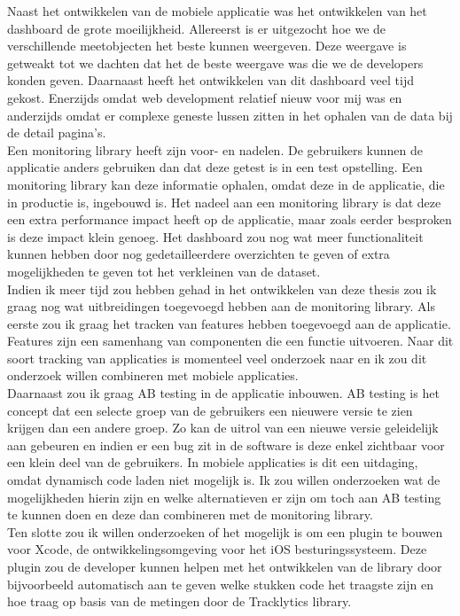 Naast het ontwikkelen van de mobiele applicatie was het ontwikkelen van het dashboard de grote moeilijkheid. Allereerst is er uitgezocht hoe we de verschillende meetobjecten het beste kunnen weergeven. Deze weergave is getweakt tot we dachten dat het de beste weergave was die we de developers konden geven. Daarnaast heeft het ontwikkelen van dit dashboard veel tijd gekost. Enerzijds omdat web development relatief nieuw voor mij was en anderzijds omdat er complexe geneste lussen zitten in het ophalen van de data bij de detail pagina's. \\

Een monitoring library heeft zijn voor- en nadelen. De gebruikers kunnen de applicatie anders gebruiken dan dat deze getest is in een test opstelling. Een monitoring library kan deze informatie ophalen, omdat deze in de applicatie, die in productie is, ingebouwd is. Het nadeel aan een monitoring library is dat deze een extra performance impact heeft op de applicatie, maar zoals eerder besproken is deze impact klein genoeg. Het dashboard zou nog wat meer functionaliteit kunnen hebben door nog gedetailleerdere overzichten te geven of extra mogelijkheden te geven tot het verkleinen van de dataset. \\

Indien ik meer tijd zou hebben gehad in het ontwikkelen van deze thesis zou ik graag nog wat uitbreidingen toegevoegd hebben aan de monitoring library. Als eerste zou ik graag het tracken van features hebben toegevoegd aan de applicatie. Features zijn een samenhang van componenten die een functie uitvoeren. Naar dit soort tracking van applicaties is momenteel veel onderzoek naar en ik zou dit onderzoek willen combineren met mobiele applicaties. \\
Daarnaast zou ik graag AB testing in de applicatie inbouwen. AB testing is het concept dat een selecte groep van de gebruikers een nieuwere versie te zien krijgen dan een andere groep. Zo kan de uitrol van een nieuwe versie geleidelijk aan gebeuren en indien er een bug zit in de software is deze enkel zichtbaar voor een klein deel van de gebruikers. In mobiele applicaties is dit een uitdaging, omdat dynamisch code laden niet mogelijk is. Ik zou willen onderzoeken wat de mogelijkheden hierin zijn en welke alternatieven er zijn om toch aan AB testing te kunnen doen en deze dan combineren met de monitoring library.\\
Ten slotte zou ik willen onderzoeken of het mogelijk is om een plugin te bouwen voor Xcode, de ontwikkelingsomgeving voor het iOS besturingssysteem. Deze plugin zou de developer kunnen helpen met het ontwikkelen van de library door bijvoorbeeld automatisch aan te geven welke stukken code het traagste zijn en hoe traag op basis van de metingen door de Tracklytics library. \\
 
